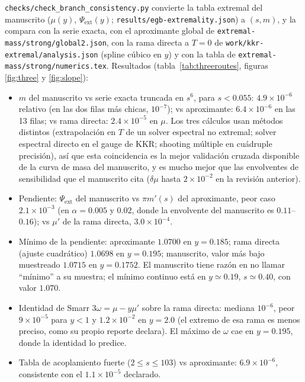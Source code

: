 \documentclass[10pt,a4paper]{article}
\newcommand{\code}[1]{\texttt{#1}}
\newcommand{\ext}{\mathrm{ext}}
\begin{document}
\code{checks/check\_branch\_consistency.py} convierte la tabla extremal del manuscrito
($\mu(y)$, $\Psi_\ext(y)$; \code{results/egb-extremality.json}) a $(s,m)$, y la compara con la serie
exacta, con el aproximante global de \code{extremal-mass/strong/global2.json}, con la rama directa a
$T=0$ de \code{work/kkr-extremal/analysis.json} (spline cúbico en $y$) y con la tabla de
\code{extremal-mass/strong/numerics.tex}. Resultados (tabla~\ref{tab:threeroutes}, figuras
\ref{fig:three} y \ref{fig:slope}):
\begin{itemize}
\item $m$ del manuscrito vs serie exacta truncada en $s^6$, para $s<0.055$: $4.9\times10^{-6}$
 relativo (en las dos filas más chicas, $10^{-7}$); vs aproximante: $6.4\times10^{-6}$ en las 13
 filas; vs rama directa: $2.4\times10^{-5}$ en $\mu$. Los tres cálculos usan métodos distintos
 (extrapolación en $T$ de un solver espectral no extremal; solver espectral directo en el gauge de
 KKR; shooting múltiple en cuádruple precisión), así que esta coincidencia es la mejor validación
 cruzada disponible de la curva de masa del manuscrito, y es mucho mejor que las envolventes de
 sensibilidad que el manuscrito cita ($\delta\mu$ hasta $2\times10^{-2}$ en la revisión anterior).
\item Pendiente: $\Psi_\ext$ del manuscrito vs $\pi m'(s)$ del aproximante, peor caso
 $2.1\times10^{-3}$ (en $\alpha=0.005$ y $0.02$, donde la envolvente del manuscrito es
 $0.11$--$0.16$); vs $\mu'$ de la rama directa, $3.0\times10^{-4}$.
\item Mínimo de la pendiente: aproximante $1.0700$ en $y=0.185$; rama directa (ajuste cuadrático)
 $1.0698$ en $y=0.195$; manuscrito, valor más bajo muestreado $1.0715$ en $y=0.1752$. El
 manuscrito tiene razón en no llamar ``mínimo'' a su muestra; el mínimo continuo está en
 $y\simeq0.19$, $s\simeq0.40$, con valor $1.070$.
\item Identidad de Smarr $3\omega=\mu-y\mu'$ sobre la rama directa: mediana $10^{-6}$, peor
 $9\times10^{-5}$ para $y<1$ y $1.2\times10^{-2}$ en $y=2.0$ (el extremo de esa rama es menos
 preciso, como su propio reporte declara). El máximo de $\omega$ cae en $y=0.195$, donde la
 identidad lo predice.
\item Tabla de acoplamiento fuerte ($2\le s\le103$) vs aproximante: $6.9\times10^{-6}$, consistente
 con el $1.1\times10^{-5}$ declarado.
\end{itemize}
\end{document}
